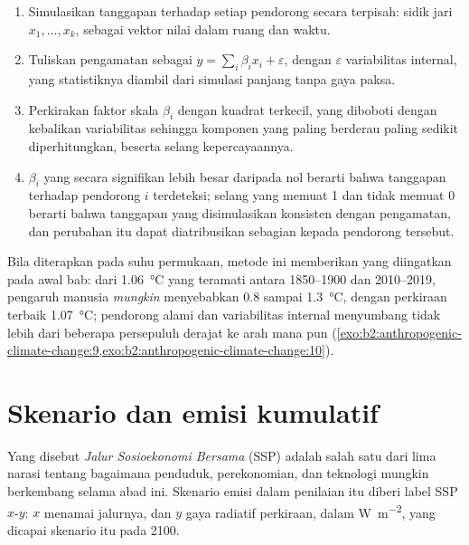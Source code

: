 \begin{method}\label{met:b2:anthropogenic-climate-change:fingerprinting}
\begin{enumerate}
  \item Simulasikan tanggapan terhadap setiap pendorong secara terpisah: sidik jari $x_1, \dots, x_k$, sebagai
        vektor nilai dalam ruang dan waktu.
  \item Tuliskan pengamatan sebagai $y = \sum_i \beta_i x_i + \varepsilon$, dengan $\varepsilon$
        variabilitas internal, yang statistiknya diambil dari simulasi panjang tanpa gaya paksa.
  \item Perkirakan faktor skala $\beta_i$ dengan kuadrat terkecil, yang diboboti dengan kebalikan
        variabilitas sehingga komponen yang paling berderau paling sedikit diperhitungkan, beserta selang kepercayaannya.
  \item $\beta_i$ yang secara signifikan lebih besar daripada nol berarti bahwa tanggapan terhadap pendorong $i$
        terdeteksi; selang yang memuat 1 dan tidak memuat 0 berarti bahwa tanggapan yang disimulasikan
        konsisten dengan pengamatan, dan perubahan itu dapat diatribusikan sebagian kepada pendorong tersebut.
\end{enumerate}
\end{method}

Bila diterapkan pada suhu permukaan, metode ini memberikan  yang diingatkan pada awal bab: dari
\qty{1.06}{\celsius} yang teramati antara 1850--1900 dan 2010--2019, pengaruh manusia \emph{mungkin}
menyebabkan 0.8 sampai \qty{1.3}{\celsius}, dengan perkiraan terbaik \qty{1.07}{\celsius}; pendorong alami dan
variabilitas internal menyumbang tidak lebih dari beberapa persepuluh derajat ke arah mana pun
(\cref{exo:b2:anthropogenic-climate-change:9,exo:b2:anthropogenic-climate-change:10}).

\section{Skenario dan emisi kumulatif}\label{sec:b2:anthropogenic-climate-change:scenarios}

\begin{definition}\label{def:b2:anthropogenic-climate-change:ssp}
Yang disebut \emph{Jalur Sosioekonomi Bersama} (SSP) adalah salah satu dari lima
narasi tentang bagaimana penduduk, perekonomian, dan teknologi mungkin berkembang selama abad ini.
Skenario emisi dalam penilaian itu diberi label SSP$x$-$y$: $x$ menamai jalurnya, dan $y$
gaya radiatif perkiraan, dalam \unit{W.m^{-2}}, yang dicapai skenario itu pada 2100.
\end{definition}


